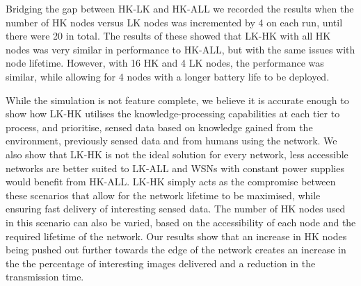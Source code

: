 Bridging the gap between HK-LK and HK-ALL we recorded the results when the number of HK nodes versus LK nodes was incremented by 4 on each run, until there were 20 in total. The results of these showed that LK-HK with all HK nodes was very similar in performance to HK-ALL, but with the same issues with node lifetime. However, with 16 HK and 4 LK nodes, the performance was similar, while allowing for 4 nodes with a longer battery life to be deployed.

While the simulation is not feature complete, we believe it is accurate enough to show how LK-HK utilises the knowledge-processing capabilities at each tier to process, and prioritise, sensed data based on knowledge gained from the environment, previously sensed data and from humans using the network. We also show that LK-HK is not the ideal solution for every network, less accessible networks are better suited to LK-ALL and WSNs with constant power supplies would benefit from HK-ALL. LK-HK simply acts as the compromise between these scenarios that allow for the network lifetime to be maximised, while ensuring fast delivery of interesting sensed data. The number of HK nodes used in this scenario can also be varied, based on the accessibility of each node and the required lifetime of the network. Our results show that an increase in HK nodes being pushed out further towards the edge of the network creates an increase in the the percentage of interesting images delivered and a reduction in the transmission time.

